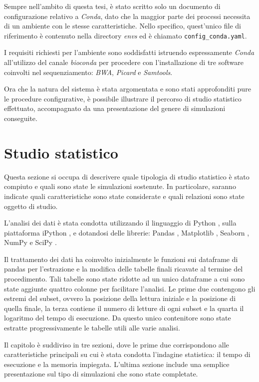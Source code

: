 Sempre nell'ambito di questa tesi, è stato scritto solo un documento di configurazione relativo a \textit{Conda}, dato che la maggior parte dei processi necessita di un ambiente con le stesse caratteristiche.
Nello specifico, quest'unico file di riferimento è contenuto nella directory \textit{envs} ed è chiamato \verb!config_conda.yaml!.

I requisiti richiesti per l'ambiente sono soddisfatti istruendo espressamente \textit{Conda} all'utilizzo del canale \textit{bioconda} per procedere con l'installazione di tre software coinvolti nel sequenziamento: \textit{BWA}, \textit{Picard} e \textit{Samtools}.

Ora che la natura del sistema è stata argomentata e sono stati approfonditi pure le procedure configurative, è possibile illustrare il percorso di studio statistico effettuato, accompagnato da una presentazione del genere di simulazioni conseguite.

\section{Studio statistico}
Questa sezione si occupa di descrivere quale tipologia di studio statistico è stato compiuto e quali sono state le simulazioni sostenute. 
In particolare, saranno indicate quali caratteristiche sono state considerate e quali relazioni sono state oggetto di studio.     

L'analisi dei dati è stata condotta utilizzando il linguaggio di Python \cite{Python}, sulla piattaforma iPython \cite{IPython}, e dotandosi delle librerie: Pandas \cite{pandas}, Matplotlib \cite{Matplotlib}, Seaborn \cite{seaborn}, NumPy \cite{Numpy} e SciPy \cite{Scipy}.

Il trattamento dei dati ha coinvolto inizialmente le funzioni sui dataframe di pandas per l'estrazione e la modifica delle tabelle finali ricavate al termine del procedimento.
Tali tabelle sono state ridotte ad un unico dataframe a cui sono state aggiunte quattro colonne per facilitare l'analisi. 
Le prime due contengono gli estremi del subset, ovvero la posizione della lettura iniziale e la posizione di quella finale, la terza contiene il numero di letture di ogni subset e la quarta il logaritmo del tempo di esecuzione.
Da questo unico contenitore sono state estratte progressivamente le tabelle utili alle varie analisi.

Il capitolo è suddiviso in tre sezioni, dove le prime due corrispondono alle caratteristiche principali su cui è stata condotta l'indagine statistica: il tempo di esecuzione e la memoria impiegata. 
L'ultima sezione include una semplice presentazione sul tipo di simulazioni che sono state completate.


